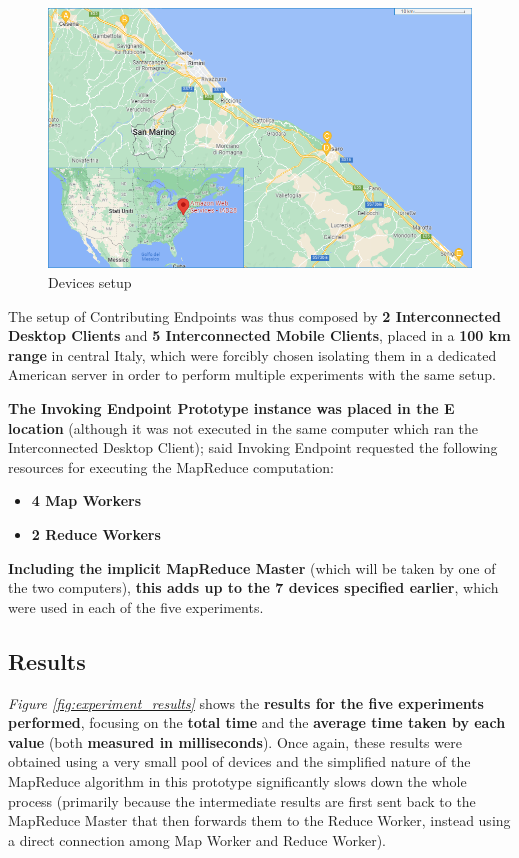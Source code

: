 \begin{figure}[!ht]
    \centering
    \includegraphics[width=\linewidth]{document/chapters/chapter_6/images/experiment_devices_setup.png}
    \caption{Devices setup}
    \label{fig:experiment_devices_setup}
\end{figure}

The setup of Contributing Endpoints was thus composed by \textbf{2 Interconnected Desktop Clients} and \textbf{5 Interconnected Mobile Clients}, placed in a \textbf{100 km range} in central Italy, which were forcibly chosen isolating them in a dedicated American server in order to perform multiple experiments with the same setup.

\textbf{The Invoking Endpoint Prototype instance was placed in the E location} (although it was not executed in the same computer which ran the Interconnected Desktop Client); said Invoking Endpoint requested the following resources for executing the MapReduce computation:
\begin{itemize}
    \item \textbf{4 Map Workers}
    \item \textbf{2 Reduce Workers}
\end{itemize}
    \textbf{Including the implicit MapReduce Master} (which will be taken by one of the two computers), \textbf{this adds up to the 7 devices specified earlier}, which were used in each of the five experiments.

\subsection{Results}
\textit{Figure \ref{fig:experiment_results}} shows the \textbf{results for the five experiments performed}, focusing on the \textbf{total time} and the \textbf{average time taken by each value} (both \textbf{measured in milliseconds}). Once again, these results were obtained using a very small pool of devices and the simplified nature of the MapReduce algorithm in this prototype significantly slows down the whole process (primarily because the intermediate results are first sent back to the MapReduce Master that then forwards them to the Reduce Worker, instead using a direct connection among Map Worker and Reduce Worker).

